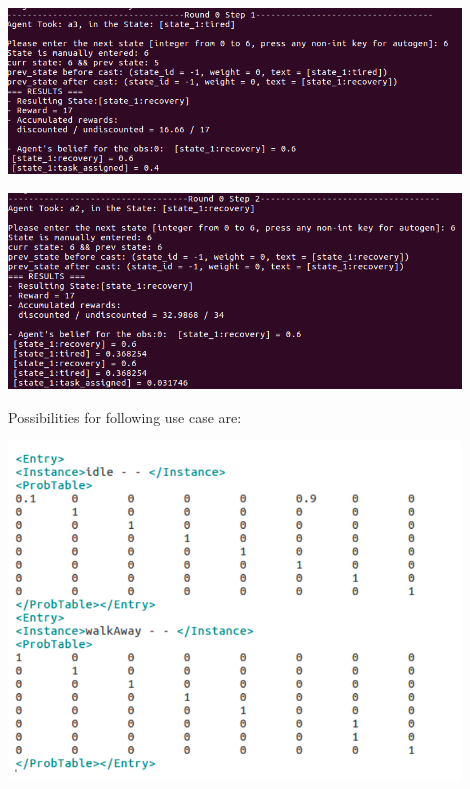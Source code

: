 \begin{minipage}{0.8\textwidth}
\centering
	\includegraphics[width=12cm]{Pictures/func/MDP/MDP8.png}
	\label{fig:MDP8}
\end{minipage}

\begin{minipage}{0.8\textwidth}
\centering
	\includegraphics[width=12cm]{Pictures/func/MDP/MDP9.png}
	\label{fig:MDP9}
\end{minipage}

Possibilities for following use case are:

\begin{minipage}{0.8\textwidth}
\centering
	\includegraphics[width=12cm]{Pictures/func/MDP/MDP10.png}
	\label{fig:MDP10}
\end{minipage}

